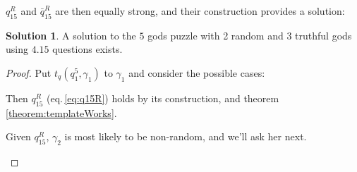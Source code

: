 \documentclass[twoside,twocolumn,a4paper,11pt]{article}
\theoremstyle{definition}
\newtheorem{solution}[theorem]{Solution}
\begin{document}
$q_{15}^R$ and $\bar{q}_{15}^R$ are then equally strong, and their construction provides a
solution:
\begin{solution}
\label{solution:5gods}
A solution to the $5$ gods puzzle with 2 random and 3 truthful gods 
using $4.15$ questions exists.
\end{solution}
\begin{proof}
Put $t_q(q_1^5,\gamma_1)$ to $\gamma_1$ and consider the possible cases:
\begin{description}[itemsep=2pt,topsep=3pt,leftmargin=0.6em]
\item[Case \(t(q_1^5,\gamma_1)\):] \hspace{0.0em}Then $q_{15}^R$ (eq.\,\eqref{eq:q15R}) 
holds by its construction, 
and theorem \ref{theorem:templateWorks}. 

Given 
$q_{15}^R$, 
$\gamma_2$ is most likely to be non-random,
and we'll ask her next.


\end{description}
\end{proof}
\end{document}
